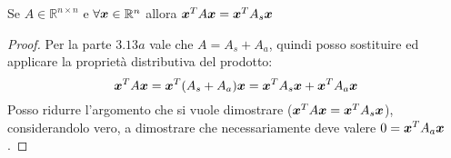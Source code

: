 \begin{exercise}[3.13b]
Se $A \in \mathbb{R}^{n \times n}$ e $\forall \boldsymbol{x} \in \mathbb{R}^{n}$
allora $\boldsymbol{x}^{T}A\boldsymbol{x} = \boldsymbol{x}^{T}A_{s}\boldsymbol{x}$
\end{exercise}
\begin{proof}
Per la parte $3.13a$ vale che $A = A_{s} + A_{a}$, quindi posso sostituire ed
applicare la propriet\`a distributiva del prodotto:
\begin{displaymath}
\boldsymbol{x}^{T}A\boldsymbol{x} = \boldsymbol{x}^{T}(A_{s} + A_{a})\boldsymbol{x} =
\boldsymbol{x}^{T}A_{s}\boldsymbol{x} + \boldsymbol{x}^{T}A_{a}\boldsymbol{x}
\end{displaymath}
Posso ridurre l'argomento che si vuole dimostrare ($\boldsymbol{x}^{T}A\boldsymbol{x} =
\boldsymbol{x}^{T}A_{s}\boldsymbol{x}$), considerandolo vero, a dimostrare che
necessariamente deve valere $0 = \boldsymbol{x}^{T}A_{a}\boldsymbol{x}$.


\end{proof}
